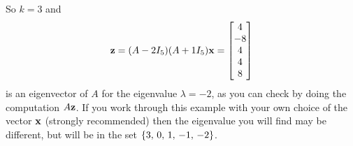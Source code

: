 \documentclass{ximera}
\begin{document}
\begin{example}
So $k=3$ and
\[
\mathbf{z}=(A-2I_5)(A+1I_5)\mathbf{x}=\begin{bmatrix}4\\-8\\4\\4\\8\end{bmatrix}
\]
is an eigenvector of $A$ for the eigenvalue $\lambda=-2$, as you can
check by doing the computation $A\mathbf{z}$.  If you work through this
example with your own choice of the vector $\mathbf{x}$ (strongly
recommended) then the eigenvalue you will find may be different, but
will be in the set $\left\{3,\,0,\,1,\,-1,\,-2\right\}$.
\end{example}
\end{document}

